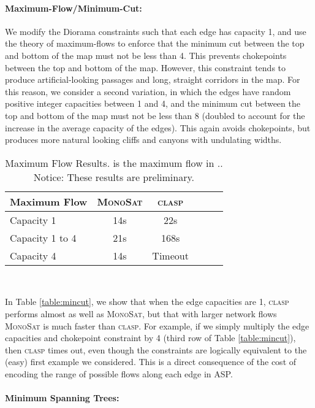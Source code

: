 \documentclass[runningheads]{llncs}
\newcommand{\algformat}[1]{\textsc{#1}\xspace}
\newcommand{\monosat}{\algformat{MonoSat}}
\newcommand{\clasp}{\algformat{clasp}}
\begin{document}
\paragraph{\textbf{Maximum-Flow/Minimum-Cut:}}
We modify the Diorama constraints such that each edge has capacity 1, and use the theory of maximum-flows to enforce that the minimum cut between the top and bottom of the map must not be less than 4. This prevents chokepoints between the top and bottom of the map. However, this constraint tends to produce artificial-looking passages and long, straight corridors in the map. For this reason, we consider a second variation, in which the edges have random positive integer capacities between 1 and 4, and the minimum cut between the top and bottom of the map must not be less than 8 (doubled to account for the increase in the average capacity of the edges). This again avoids chokepoints, but produces more natural looking cliffs and canyons with undulating widths.


\begin{wraptable}{R}{0.45\textwidth}

\begin{tabular}{ l c c c c c }
  Maximum Flow & \monosat &  \clasp  \\
  \hline
Capacity 1 & 14s & 22s  \\
   Capacity 1 to 4 &  21s   &  168s \\
   Capacity 4 & 14s &   Timeout \\
  \hline  
\end{tabular}~~~~
\caption{Maximum Flow Results.  is the maximum  flow in .\label{table:MST}. Notice: These results are preliminary.}
\end{wraptable}

In Table \ref{table:mincut}, we show that when the edge capacities are 1, \clasp performs almost as well as \monosat, but that with larger network flows \monosat is much faster than \clasp. For example, if we simply multiply the edge capacities and chokepoint constraint by 4 (third row of Table \ref{table:mincut}), then \clasp times out, even though the constraints are logically equivalent to the (easy) first example we considered. This is a direct consequence of the cost of encoding the range of possible flows along each edge in ASP.



\paragraph{\textbf{Minimum Spanning Trees:}}
\end{document}
